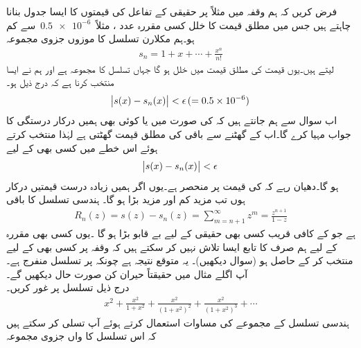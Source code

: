 \quad
فرض کریں کہ ہم وقفہ  میں مثلاً  پر حقیقی  کے تفاعل  کی قیمتوں کا ایسا جدول بنانا چاہتے ہیں جس میں مطلق قیمت کا خلل کسی مقررہ عدد ، مثلاً 
$\,\num{0.5e-6}\,$
 سے کم ہو۔ہم مکلارن تسلسل کا موزوں جزوی مجموعہ
\begin{align*}
s_n=1+x+\cdots+\frac{x^n}{n!}
\end{align*}
لیتے ہیں۔یوں قیمت کی مطلق قیمت میں خلل  ہو گا جہاں  تسلسل کا مجموعہ ہے اور ہم نے ایسا  منتخب کرنا ہے کہ درج ذیل ہو۔
\begin{align*}
\abs{s(x)-s_n(x)}<\epsilon\,(=\num{0.5e-6})
\end{align*}
اب سوال  سے ہم جانتے ہیں کہ  کی صورت میں  یا  کوئی بھی  ہمیں درکار درستگی کا جواب مہیا کرے گا۔اب  کے گھٹنے سے باقی کی مطلق قیمت  گھٹتی ہے لہٰذا  منتخب کرتے ہوئے اس خطے میں  کسی بھی  کے لیے
\begin{align*}
\abs{s(x)-s_n(x)}<\epsilon 
\end{align*}
ہو گا۔دھیان رہے کہ  کی قیمت  پر منحصر ہے۔یوں اگر ہمیں زیادہ درست قیمتیں درکار ہوں تب  مزید کم اور  مزید بڑا ہو گا۔
\quad
ہندسی تسلسل  کا باقی
\begin{align*}
R_n(z)=s(z)-s_n(z)=\sum\limits_{m=n+1}^{\infty} z^m=\frac{z^{n+1}}{1-z}
\end{align*}
ہے جو  کے کافی قریب کسی بھی حقیقی  کے لیے بے قابو بڑا ہو گا ۔یوں کسی بھی مقررہ  کے لیے ہم صرف  کا تابع ایسا  تلاش نہیں کر سکتے ہیں کہ  وقفہ  پر کسی بھی  کے لیے  منتخب کر کے  حاصل ہو (سوال  دیکھیں)۔ یہ متوقع نتیجہ  ہے چونکہ  پر تسلسل منفرج ہے۔آپ اگلے مثال میں حقیقتاً حیران کن صورت حال دیکھیں گے۔
\quad \\
درج ذیل تسلسل پر غور کریں۔
\begin{align*}
x^2+\frac{x^2}{1+x^2}+\frac{x^2}{(1+x^2)^2}+\frac{x^2}{(1+x^2)^3}+\cdots
\end{align*}
ہندسی تسلسل کے مجموعے کی مساوات استعمال کرتے ہوئے آپ تسلی کر سکتے ہیں کہ اس تسلسل کا  واں جزوی مجموعہ 
